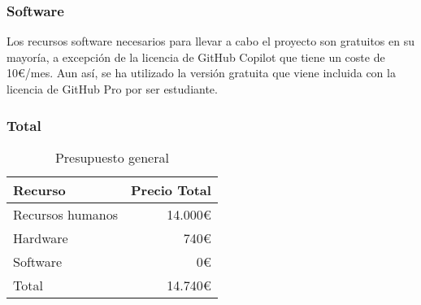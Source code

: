 \subsubsection{Software}
Los recursos software necesarios para llevar a cabo el proyecto son gratuitos
en su mayoría, a excepción de la licencia de GitHub Copilot que tiene un coste
de 10\euro/mes. Aun así, se ha utilizado la versión gratuita que viene incluida
con la licencia de GitHub Pro por ser estudiante.

\subsubsection{Total}
\begin{table}
    \centering
    \begin{tabular}[ht]{l|r}
        \textbf{Recurso} & \textbf{Precio Total} \\
        \hline
        Recursos humanos & 14.000\euro           \\
        Hardware         & 740\euro              \\
        Software         & 0\euro                \\
        \hline
        Total            & 14.740\euro           \\
    \end{tabular}
    \caption{Presupuesto general}
    \label{tab:total-budget}
\end{table}

\pagebreak